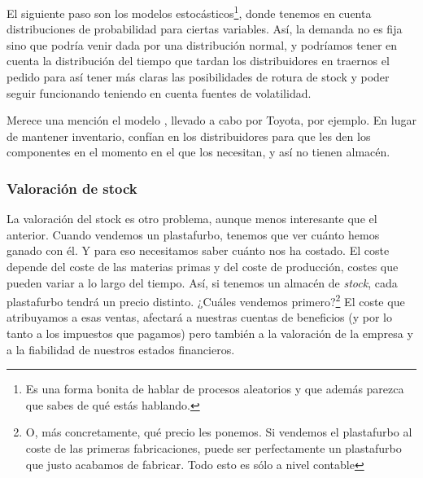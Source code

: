 \documentclass[nochap,palatino,notitlepage]{apuntes}
\begin{document}
El siguiente paso son los modelos estocásticos\footnote{Es una forma bonita de hablar de procesos aleatorios y que además parezca que sabes de qué estás hablando.}, donde tenemos en cuenta distribuciones de probabilidad para ciertas variables. Así, la demanda no es fija sino que podría venir dada por una distribución normal, y podríamos tener en cuenta la distribución del tiempo que tardan los distribuidores en traernos el pedido para así tener más claras las posibilidades de rotura de stock y poder seguir funcionando teniendo en cuenta fuentes de volatilidad.

Merece una mención el modelo , llevado a cabo por Toyota, por ejemplo. En lugar de mantener inventario, confían en los distribuidores para que les den los componentes en el momento en el que los necesitan, y así no tienen almacén.

\subsubsection{Valoración de stock}

La valoración del stock es otro problema, aunque menos interesante que el anterior. Cuando vendemos un plastafurbo, tenemos que ver cuánto hemos ganado con él. Y para eso necesitamos saber cuánto nos ha costado. El coste depende del coste de las materias primas y del coste de producción, costes que pueden variar a lo largo del tiempo. Así, si tenemos un almacén de \textit{stock}, cada plastafurbo tendrá un precio distinto. ¿Cuáles vendemos primero?\footnote{O, más concretamente, qué precio les ponemos. Si vendemos el plastafurbo al coste de las primeras fabricaciones, puede ser perfectamente un plastafurbo que justo acabamos de fabricar. Todo esto es sólo a nivel contable } El coste que atribuyamos a esas ventas, afectará a nuestras cuentas de beneficios (y por lo tanto a los impuestos que pagamos) pero también a la valoración de la empresa y a la fiabilidad de nuestros estados financieros.
\end{document}
